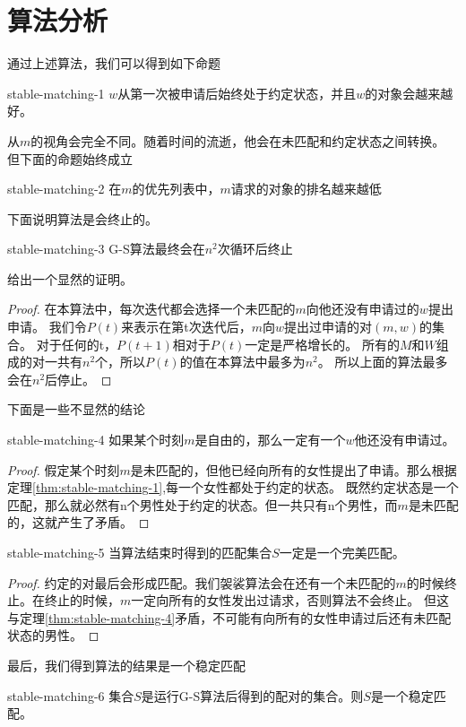 \section{算法分析}\label{sec:stable-matching-analyze}
通过上述算法，我们可以得到如下命题
\begin{theorem}{}{stable-matching-1}
	$w$从第一次被申请后始终处于约定状态，并且$w$的对象会越来越好。
\end{theorem}
从$m$的视角会完全不同。随着时间的流逝，他会在未匹配和约定状态之间转换。
但下面的命题始终成立
\begin{theorem}{}{stable-matching-2}
	在$m$的优先列表中，$m$请求的对象的排名越来越低
\end{theorem}
下面说明算法是会终止的。
\begin{theorem}{}{stable-matching-3}
	G-S算法最终会在$n^2$次循环后终止
\end{theorem}
给出一个显然的证明。
\begin{proof}
	在本算法中，每次迭代都会选择一个未匹配的$m$向他还没有申请过的$w$提出申请。
	我们令$P(t)$来表示在第t次迭代后，$m$向$w$提出过申请的对$(m,w)$的集合。
	对于任何的t，$P(t+1)$相对于$P(t)$一定是严格增长的。
	所有的$M$和$W$组成的对一共有$n^2$个，所以$P(t)$的值在本算法中最多为$n^2$。
	所以上面的算法最多会在$n^2$后停止。
\end{proof}
下面是一些不显然的结论
\begin{theorem}{}{stable-matching-4}
	如果某个时刻$m$是自由的，那么一定有一个$w$他还没有申请过。
\end{theorem}
\begin{proof}
	假定某个时刻$m$是未匹配的，但他已经向所有的女性提出了申请。那么根据定理\ref{thm:stable-matching-1},每一个女性都处于约定的状态。
	既然约定状态是一个匹配，那么就必然有n个男性处于约定的状态。但一共只有n个男性，而$m$是未匹配的，这就产生了矛盾。
\end{proof}
\begin{theorem}{}{stable-matching-5}
	当算法结束时得到的匹配集合$S$一定是一个完美匹配。
\end{theorem}
\begin{proof}
	约定的对最后会形成匹配。我们袈裟算法会在还有一个未匹配的$m$的时候终止。在终止的时候，$m$一定向所有的女性发出过请求，否则算法不会终止。
	但这与定理\ref{thm:stable-matching-4}矛盾，不可能有向所有的女性申请过后还有未匹配状态的男性。
\end{proof}
最后，我们得到算法的结果是一个稳定匹配
\begin{theorem}{}{stable-matching-6}
	集合$S$是运行G-S算法后得到的配对的集合。则$S$是一个稳定匹配。
\end{theorem}
